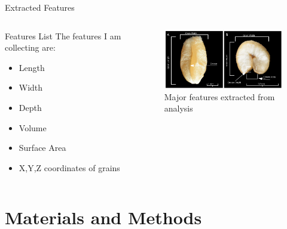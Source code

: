 \documentclass[t, aspectratio=169]{beamer}
\begin{document}
\begin{frame}[label={sec:orgbe02cf8}]{Extracted Features}
\begin{columns}
\begin{column}{0.45\columnwidth}
\begin{block}{Features List}
The features I am collecting are:

\begin{itemize}
\item Length
\item Width
\item Depth
\item Volume
\item Surface Area
\item X,Y,Z coordinates of grains
\end{itemize}
\end{block}
\end{column}

\begin{column}{0.6\columnwidth}
\begin{figure}[htbp]
\centering
\includegraphics[width=8cm]{./images/seeds.png}
\caption{Major features extracted from analysis}
\end{figure}
\end{column}
\end{columns}
\end{frame}

\section{Materials and Methods}
\label{sec:org910cc87}
\end{document}
